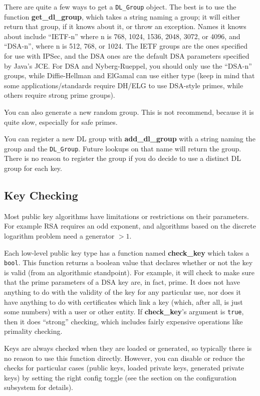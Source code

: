 \documentclass{article}
\newcommand{\function}[1]{\textbf{#1}}
\newcommand{\type}[1]{\texttt{#1}}
\begin{document}
There are quite a few ways to get a \type{DL\_Group} object. The best is to use
the function \function{get\_dl\_group}, which takes a string naming a group; it
will either return that group, if it knows about it, or throw an
exception. Names it knows about include ``IETF-n'' where n is 768, 1024, 1536,
2048, 3072, or 4096, and ``DSA-n'', where n is 512, 768, or 1024. The IETF
groups are the ones specified for use with IPSec, and the DSA ones are the
default DSA parameters specified by Java's JCE. For DSA and Nyberg-Rueppel, you
should only use the ``DSA-n'' groups, while Diffie-Hellman and ElGamal can use
either type (keep in mind that some applications/standards require DH/ELG to
use DSA-style primes, while others require strong prime groups).

You can also generate a new random group. This is not recommend, because it is
quite slow, especially for safe primes.

You can register a new DL group with \function{add\_dl\_group} with a string
naming the group and the \type{DL\_Group}. Future lookups on that name will
return the group. There is no reason to register the group if you do decide to
use a distinct DL group for each key.

\subsection{Key Checking}

Most public key algorithms have limitations or restrictions on their
parameters. For example RSA requires an odd exponent, and algorithms based on
the discrete logarithm problem need a generator $> 1$.

Each low-level public key type has a function named \function{check\_key} which
takes a \type{bool}. This function returns a boolean value that declares
whether or not the key is valid (from an algorithmic standpoint). For example,
it will check to make sure that the prime parameters of a DSA key are, in fact,
prime. It does not have anything to do with the validity of the key for any
particular use, nor does it have anything to do with certificates which link a
key (which, after all, is just some numbers) with a user or other entity. If
\function{check\_key}'s argument is \type{true}, then it does ``strong''
checking, which includes fairly expensive operations like primality checking.

Keys are always checked when they are loaded or generated, so typically there
is no reason to use this function directly. However, you can disable or reduce
the checks for particular cases (public keys, loaded private keys, generated
private keys) by setting the right config toggle (see the section on the
configuration subsystem for details).
\end{document}
